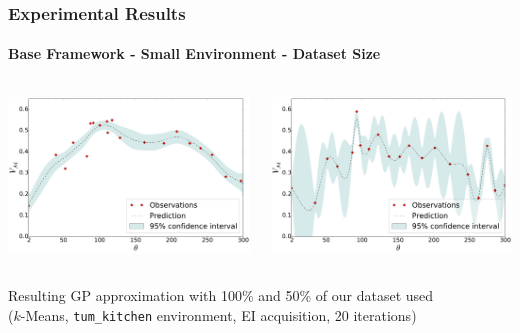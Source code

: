 \begin{frame}
	\frametitle{Experimental Results}
	\framesubtitle{Base Framework - Small Environment - Dataset Size}
	\vspace{10pt}
	\begin{columns}
		\begin{column}{0.5\textwidth}
			\includegraphics[width=\linewidth]{../../figures/plots/tum_base/plot_b_00__alg_kmeans_pct_100_acq_ei}
		\end{column}
		\begin{column}{0.5\textwidth}
			\includegraphics[width=\linewidth]{../../figures/plots/tum_base/plot_b_00__alg_kmeans_pct_50_acq_ei}
		\end{column}
	\end{columns}
	\begin{center}
		\footnotesize
		Resulting GP approximation with 100\% and 50\% of our dataset used\\
		($k$-Means, \texttt{tum\_kitchen} environment, EI acquisition, 20 iterations)
	\end{center}
\end{frame}

